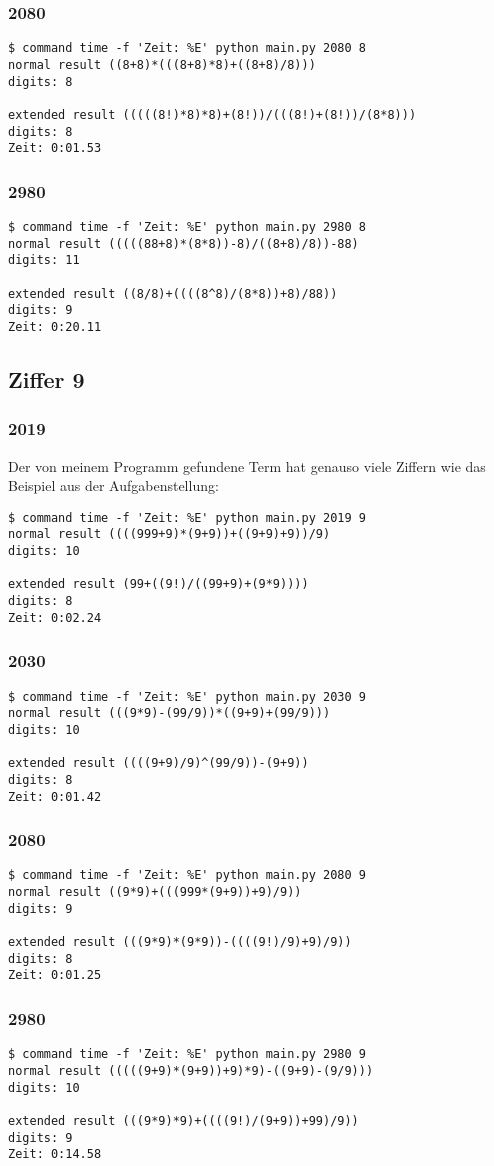 \subsubsection{2080}
\begin{lstlisting}
$ command time -f 'Zeit: %E' python main.py 2080 8
normal result ((8+8)*(((8+8)*8)+((8+8)/8)))
digits: 8

extended result (((((8!)*8)*8)+(8!))/(((8!)+(8!))/(8*8)))
digits: 8
Zeit: 0:01.53
\end{lstlisting}
\subsubsection{2980}
\begin{lstlisting}
$ command time -f 'Zeit: %E' python main.py 2980 8
normal result (((((88+8)*(8*8))-8)/((8+8)/8))-88)
digits: 11

extended result ((8/8)+((((8^8)/(8*8))+8)/88))
digits: 9
Zeit: 0:20.11
\end{lstlisting}
\subsection{Ziffer 9}
\subsubsection{2019}
Der von meinem Programm gefundene Term hat genauso viele Ziffern wie das Beispiel aus der Aufgabenstellung:
\begin{lstlisting}
$ command time -f 'Zeit: %E' python main.py 2019 9
normal result ((((999+9)*(9+9))+((9+9)+9))/9)
digits: 10

extended result (99+((9!)/((99+9)+(9*9))))
digits: 8
Zeit: 0:02.24
\end{lstlisting}
\subsubsection{2030}
\begin{lstlisting}
$ command time -f 'Zeit: %E' python main.py 2030 9
normal result (((9*9)-(99/9))*((9+9)+(99/9)))
digits: 10

extended result ((((9+9)/9)^(99/9))-(9+9))
digits: 8
Zeit: 0:01.42
\end{lstlisting}
\subsubsection{2080}
\begin{lstlisting}
$ command time -f 'Zeit: %E' python main.py 2080 9
normal result ((9*9)+(((999*(9+9))+9)/9))
digits: 9

extended result (((9*9)*(9*9))-((((9!)/9)+9)/9))
digits: 8
Zeit: 0:01.25
\end{lstlisting}
\subsubsection{2980}
\begin{lstlisting}
$ command time -f 'Zeit: %E' python main.py 2980 9
normal result (((((9+9)*(9+9))+9)*9)-((9+9)-(9/9)))
digits: 10

extended result (((9*9)*9)+((((9!)/(9+9))+99)/9))
digits: 9
Zeit: 0:14.58
\end{lstlisting}
